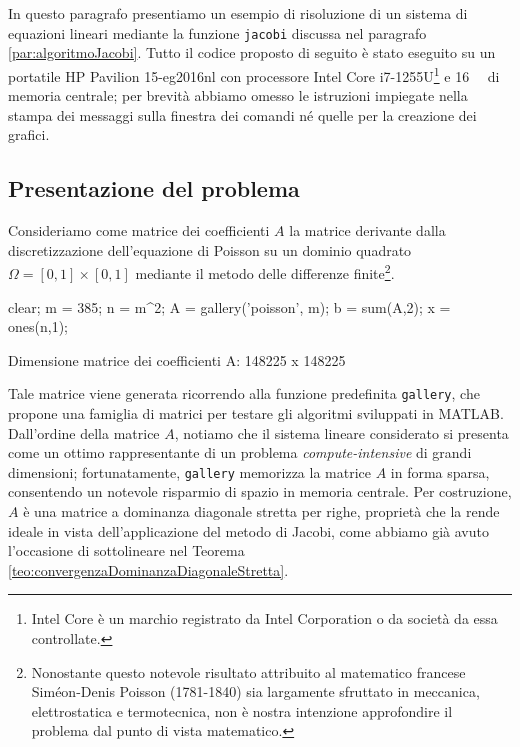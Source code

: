 In questo paragrafo presentiamo un esempio di risoluzione di un sistema di equazioni lineari mediante la funzione
\lstinline{jacobi} discussa nel paragrafo \ref{par:algoritmoJacobi}. \newline
Tutto il codice proposto di seguito \`e stato eseguito su un portatile HP Pavilion 15-eg2016nl con processore Intel\textsuperscript{\textregistered} Core\textsuperscript{\texttrademark} i7-1255U\footnote{Intel Core \`e un marchio registrato da Intel Corporation o da societ\`a da essa controllate.} e \qty{16}{\giga\byte} di memoria centrale; per brevit\`a abbiamo omesso le istruzioni impiegate nella stampa dei messaggi sulla finestra dei comandi n\'e quelle per la creazione dei grafici.
\subsection{Presentazione del problema}
Consideriamo come matrice dei coefficienti $A$ la matrice derivante dalla discretizzazione dell'equazione di Poisson su un
dominio quadrato $\Omega=[0, 1]\times[0, 1]$ mediante il metodo delle differenze finite\footnote{
    Nonostante questo notevole risultato attribuito al matematico francese Sim\'eon-Denis Poisson (1781-1840) sia largamente sfruttato in meccanica,
    elettrostatica e termotecnica, non \`e nostra intenzione approfondire il problema dal punto di vista matematico.}.
\begin{matlabcode}
    clear;
    m = 385;
    n = m^2;
    A = gallery('poisson', m);
    b = sum(A,2);
    x = ones(n,1);
\end{matlabcode}
\begin{matlaboutput}
    Dimensione matrice dei coefficienti A: 148225 x 148225
\end{matlaboutput}
Tale matrice viene generata ricorrendo alla funzione predefinita \lstinline{gallery}, che propone una famiglia di matrici per testare gli algoritmi sviluppati in MATLAB.\newline
Dall'ordine della matrice $A$, notiamo che il sistema lineare considerato si presenta come un ottimo rappresentante
di un problema \textit{compute-intensive} di grandi dimensioni; fortunatamente, \lstinline{gallery} memorizza la matrice $A$ in
forma sparsa, consentendo un notevole risparmio di spazio in memoria centrale.\newline
Per costruzione, $A$ \`e una matrice a dominanza diagonale stretta per righe, propriet\`a che la rende ideale
in vista dell'applicazione del metodo di Jacobi, come abbiamo gi\`a avuto l'occasione di sottolineare nel Teorema
\ref{teo:convergenzaDominanzaDiagonaleStretta}.


